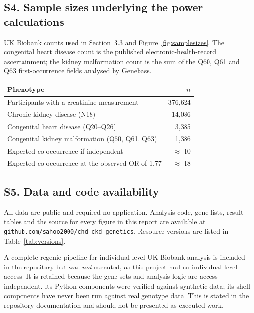 \documentclass[11pt,a4paper]{article}
\begin{document}
\subsection*{S4. Sample sizes underlying the power calculations}

UK Biobank counts used in Section~3.3 and Figure~\ref{fig:samplesizes}. The congenital heart
disease count is the published electronic-health-record ascertainment; the kidney
malformation count is the sum of the Q60, Q61 and Q63 first-occurrence fields analysed by
Genebass.

\begin{table}[H]
\centering
\small
\begin{tabular}{lr}
\toprule
Phenotype & $n$ \\
\midrule
Participants with a creatinine measurement & 376,624 \\
Chronic kidney disease (N18) & 14,086 \\
Congenital heart disease (Q20--Q26) & 3,385 \\
Congenital kidney malformation (Q60, Q61, Q63) & 1,386 \\
Expected co-occurrence if independent & $\approx$ 10 \\
Expected co-occurrence at the observed OR of 1.77 & $\approx$ 18 \\
\bottomrule
\end{tabular}
\end{table}

\subsection*{S5. Data and code availability}

All data are public and required no application. Analysis code, gene lists, result tables
and the source for every figure in this report are available at
\texttt{github.com/sahoo2000/chd-ckd-genetics}. Resource versions are listed in
Table~\ref{tab:versions}.

\enlargethispage{3\baselineskip}
A complete regenie \cite{mbatchou2021} pipeline for individual-level UK Biobank analysis is
included in the repository but was \emph{not} executed, as this project had no
individual-level access. It is retained because the gene sets and analysis logic are
access-independent. Its Python components were verified against synthetic data; its shell
components have never been run against real genotype data. This is stated in the repository
documentation and should not be presented as executed work.
\end{document}
